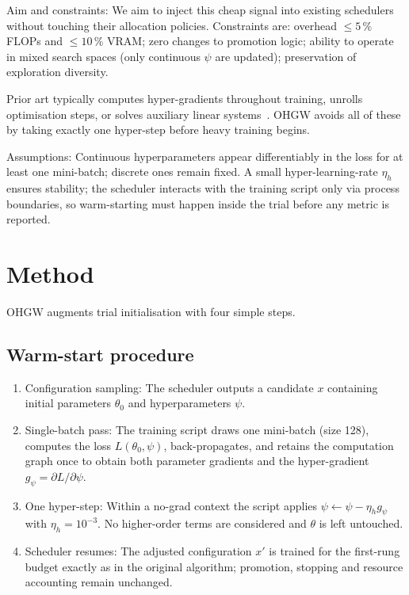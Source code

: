 \documentclass{article}
\begin{document}
Aim and constraints: We aim to inject this cheap signal into existing schedulers without touching their allocation policies. Constraints are: overhead \(\leq 5\,\%\) FLOPs and \(\leq 10\,\%\) VRAM\@; zero changes to promotion logic; ability to operate in mixed search spaces (only continuous \(\psi\) are updated); preservation of exploration diversity.

Prior art typically computes hyper-gradients throughout training, unrolls optimisation steps, or solves auxiliary linear systems~\cite{bertrand-2020-implicit,immer-2023-stochastic}. OHGW avoids all of these by taking exactly one hyper-step before heavy training begins.

Assumptions: Continuous hyperparameters appear differentiably in the loss for at least one mini-batch; discrete ones remain fixed. A small hyper-learning-rate \(\eta_h\) ensures stability; the scheduler interacts with the training script only via process boundaries, so warm-starting must happen inside the trial before any metric is reported.

\section{Method}
OHGW augments trial initialisation with four simple steps.

\subsection{Warm-start procedure}
\begin{enumerate}
  \item Configuration sampling: The scheduler outputs a candidate \(x\) containing initial parameters \(\theta_0\) and hyperparameters \(\psi\).
  \item Single-batch pass: The training script draws one mini-batch (size 128), computes the loss \(L(\theta_0,\psi)\), back-propagates, and retains the computation graph once to obtain both parameter gradients and the hyper-gradient \(g_\psi = \partial L/\partial \psi\).
  \item One hyper-step: Within a no-grad context the script applies \(\psi \leftarrow \psi - \eta_h g_\psi\) with \(\eta_h = 10^{-3}\). No higher-order terms are considered and \(\theta\) is left untouched.
  \item Scheduler resumes: The adjusted configuration \(x'\) is trained for the first-rung budget exactly as in the original algorithm; promotion, stopping and resource accounting remain unchanged.
\end{enumerate}
\end{document}
